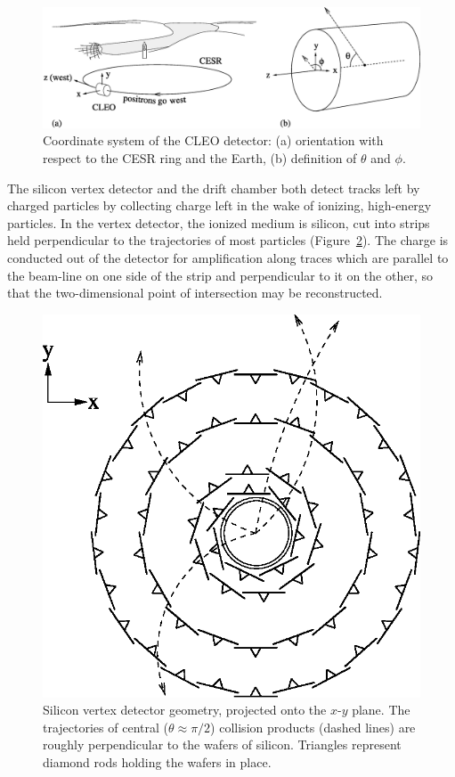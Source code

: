 \documentclass{cornell}
\begin{document}
\begin{figure}[p]
  \begin{center}
    \includegraphics[width=\linewidth]{coordinatesystem}
  \end{center}
  \caption[Coordinate system of the CLEO
  detector]{\label{coordinatesystem} Coordinate system of the CLEO
  detector: (a) orientation with respect to the CESR ring and the
  Earth, (b) definition of $\theta$ and $\phi$.}
\end{figure}

The silicon vertex detector and the drift chamber both detect tracks
left by charged particles by collecting charge left in the wake of
ionizing, high-energy particles.  In the vertex detector, the ionized
medium is silicon, cut into strips held perpendicular to the
trajectories of most particles (Figure~\ref{sidiagram}).  The charge
is conducted out of the detector for amplification along traces which
are parallel to the beam-line on one side of the strip and
perpendicular to it on the other, so that the two-dimensional point of
intersection may be reconstructed.

\begin{figure}[p]
  \begin{center}
    \includegraphics[width=0.5\linewidth]{sidiagram}
  \end{center}
  \caption[Silicon vertex detector geometry]{\label{sidiagram} Silicon
  vertex detector geometry, projected onto the $x$-$y$ plane.  The
  trajectories of central ($\theta \approx \pi/2$) collision products
  (dashed lines) are roughly perpendicular to the wafers of silicon.
  Triangles represent diamond rods holding the wafers in place.}
\end{figure}
\end{document}
